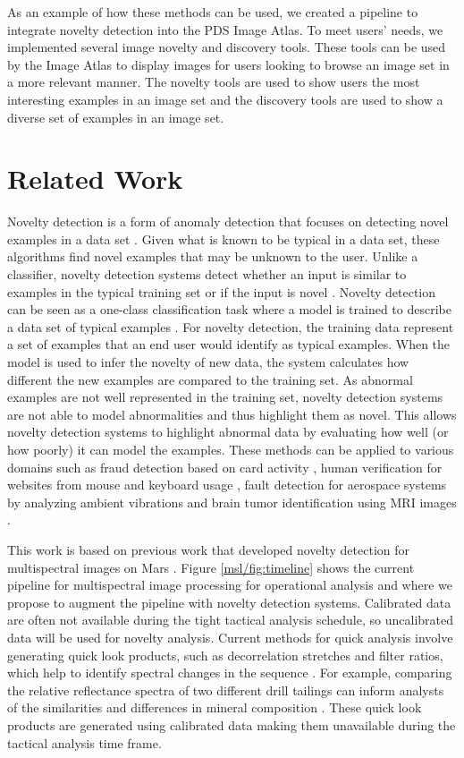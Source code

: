 As an example of how these methods can be used, we created a pipeline to integrate novelty detection into the PDS Image Atlas.
To meet users' needs, we implemented several image novelty and discovery tools.
These tools can be used by the Image Atlas to display images for users looking to browse an image set in a more relevant manner. 
The novelty tools are used to show users the most interesting examples in an image set and the discovery tools are used to show a diverse set of examples in an image set.

\section{Related Work}
Novelty detection is a form of anomaly detection that focuses on detecting novel examples in a data set \parencite{domingues2019comparative}. 
Given what is known to be typical in a data set, these algorithms find novel examples that may be unknown to the user.
Unlike a classifier, novelty detection systems detect whether an input is similar to examples in the typical training set or if the input is novel \parencite{markou2003novelty}.
Novelty detection can be seen as a one-class classification task where a model is trained to describe a data set of typical examples \parencite{pimentel2014review}. 
For novelty detection, the training data represent a set of examples that an end user would identify as typical examples. 
When the model is used to infer the novelty of new data, the system calculates how different the new examples are compared to the training set. 
As abnormal examples are not well represented in the training set, novelty detection systems are not able to model abnormalities and thus highlight them as novel. 
This allows novelty detection systems to highlight abnormal data by evaluating how well (or how poorly) it can model the examples. 
These methods can be applied to various domains such as fraud detection based on card activity \parencite{oosterlinck2020one}, human verification for websites from mouse and keyboard usage \parencite{kim2018keystroke}, fault detection for aerospace systems by analyzing ambient vibrations \parencite{worden1997structural} and brain tumor identification using MRI images \parencite{wang2020brain}.

This work is based on previous work that developed novelty detection for multispectral images on Mars \parencite{kerner2020comparison}.
Figure \ref{msl/fig:timeline} shows the current pipeline for multispectral image processing for operational analysis and where we propose to augment the pipeline with novelty detection systems. 
Calibrated data are often not available during the tight tactical analysis schedule, so uncalibrated data will be used for novelty analysis. 
Current methods for quick analysis involve generating quick look products, such as decorrelation stretches and filter ratios, which help to identify spectral changes in the sequence \parencite{gillespie1986color}.
For example, comparing the relative reflectance spectra of two different drill tailings can inform analysts of the similarities and differences in mineral composition \parencite{wellington2017visible}.
These quick look products are generated using calibrated data making them unavailable during the tactical analysis time frame.  

